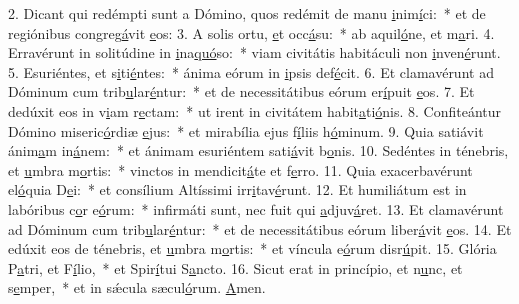 2. Dicant qui redémpti sunt a Dómino, quos redémit de manu \uline{i}nim\uline{í}ci:~* et de regiónibus congreg\uline{á}vit \uline{e}os:
3. A solis ortu, \uline{e}t occ\uline{á}su:~* ab aquil\uline{ó}ne, et m\uline{a}ri.
4. Erravérunt in solitúdine in \uline{i}na\uline{quó}so:~* viam civitátis habitáculi non \uline{i}nven\uline{é}runt.
5. Esuriéntes, et s\uline{i}ti\uline{é}ntes:~* ánima eórum in \uline{i}psis def\uline{é}cit.
6. Et clamavérunt ad Dóminum cum trib\uline{u}lar\uline{é}ntur:~* et de necessitátibus eórum er\uline{í}puit \uline{e}os.
7. Et dedúxit eos in v\uline{i}am r\uline{e}ctam:~* ut irent in civitátem habit\uline{a}ti\uline{ó}nis.
8. Confiteántur Dómino miseric\uline{ó}rdiæ \uline{e}jus:~* et mirabília ejus f\uline{í}liis h\uline{ó}minum.
9. Quia satiávit ánim\uline{a}m in\uline{á}nem:~* et ánimam esuriéntem sati\uline{á}vit b\uline{o}nis.
10. Sedéntes in ténebris, et \uline{u}mbra m\uline{o}rtis:~* vinctos in mendicit\uline{á}te et f\uline{e}rro.
11. Quia exacerbavérunt el\uline{ó}quia D\uline{e}i:~* et consílium Altíssimi irr\uline{i}tav\uline{é}runt.
12. Et humiliátum est in labóribus c\uline{o}r e\uline{ó}rum:~* infirmáti sunt, nec fuit qui \uline{a}djuv\uline{á}ret.
13. Et clamavérunt ad Dóminum cum trib\uline{u}lar\uline{é}ntur:~* et de necessitátibus eórum liber\uline{á}vit \uline{e}os.
14. Et edúxit eos de ténebris, et \uline{u}mbra m\uline{o}rtis:~* et víncula e\uline{ó}rum disr\uline{ú}pit.
15. Glória P\uline{a}tri, et F\uline{í}lio,~* et Spir\uline{í}tui S\uline{a}ncto.
16. Sicut erat in princípio, et n\uline{u}nc, et s\uline{e}mper,~* et in sǽcula sæcul\uline{ó}rum. \uline{A}men.
